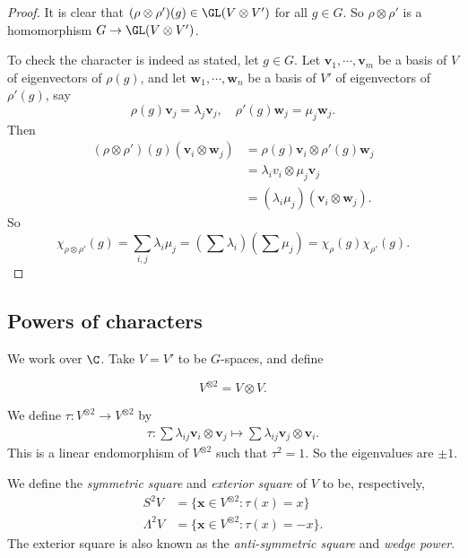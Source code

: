 \documentclass[a4paper]{article}
\begin{document}
\begin{proof}
  It is clear that $(\rho \otimes \rho')(g) \in \GL(V \otimes V')$ for all $g \in G$. So $\rho \otimes \rho'$ is a homomorphism $G \to \GL(V \otimes V')$.

  To check the character is indeed as stated, let $g \in G$. Let $\mathbf{v}_1, \cdots, \mathbf{v}_m$ be a basis of $V$ of eigenvectors of $\rho(g)$, and let $\mathbf{w}_1, \cdots, \mathbf{w}_n$ be a basis of $V'$ of eigenvectors of $\rho'(g)$, say
  \[
    \rho(g) \mathbf{v}_j = \lambda_j \mathbf{v}_j,\quad \rho'(g) \mathbf{w}_j = \mu_j \mathbf{w}_j.
  \]
  Then
  \begin{align*}
    (\rho\otimes \rho')(g)(\mathbf{v}_i \otimes \mathbf{w}_j) &= \rho(g) \mathbf{v}_i \otimes \rho'(g) \mathbf{w}_j\\
    &= \lambda_i v_i \otimes \mu_j \mathbf{v}_j\\
    &= (\lambda_i \mu_j) (\mathbf{v}_i \otimes \mathbf{w}_j).
  \end{align*}
  So
  \[
    \chi_{\rho\otimes \rho'}(g) = \sum_{i, j} \lambda_i \mu_j = \left(\sum \lambda_i\right)\left(\sum \mu_j\right) = \chi_\rho(g) \chi_{\rho'}(g).
  \]
\end{proof}
\subsection{Powers of characters}
We work over $\C$. Take $V = V'$ to be $G$-spaces, and define
\begin{notation}
  \[
    V^{\otimes 2} = V\otimes V.
  \]
\end{notation}
We define $\tau: V^{\otimes 2} \to V^{\otimes 2}$ by
\begin{align*}
  \tau: \sum \lambda_{ij} \mathbf{v}_i \otimes \mathbf{v}_j \mapsto \sum \lambda_{ij} \mathbf{v}_j \otimes \mathbf{v}_i.
\end{align*}
This is a linear endomorphism of $V^{\otimes 2}$ such that $\tau^2 = 1$. So the eigenvalues are $\pm 1$.

\begin{defi}
  We define the \emph{symmetric square} and \emph{exterior square} of $V$ to be, respectively,
  \begin{align*}
    S^2 V &= \{\mathbf{x} \in V^{\otimes 2}: \tau(x) = x\}\\
    \Lambda^2 V &= \{\mathbf{x} \in V^{\otimes 2}: \tau(x) = -x\}.
  \end{align*}
  The exterior square is also known as the \emph{anti-symmetric square} and \emph{wedge power}.
\end{defi}
\end{document}
